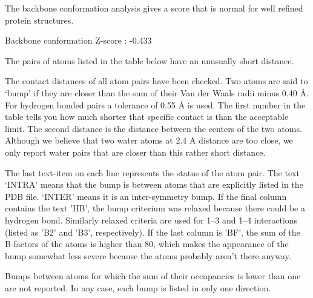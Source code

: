 \begin{note}
The backbone conformation analysis gives a score that is normal
for well refined protein structures.

\parbox{1\textwidth}{
 Backbone conformation Z-score : -0.433
}%

\end{note}

\begin{error}
The pairs of atoms listed in the table below have an unusually
short distance.

The contact distances of all atom pairs have been checked. Two
atoms are said to `bump' if they are closer than the sum of their
Van der Waals radii minus 0.40 {\AA}. For hydrogen bonded pairs
a tolerance of 0.55 {\AA} is used.  The first number in the
table tells you how much shorter that specific contact is than the
acceptable limit. The second distance is the distance between the
centers of the two atoms. Although we believe that two water atoms
at 2.4 A distance are too close, we only report water pairs that are
closer than this rather short distance.

The last text-item on each line represents the status of the atom
pair.  The text `INTRA' means that the bump is between atoms that
are explicitly listed in the PDB file. `INTER' means it is an
inter-symmetry bump. If the final column contains the text 'HB',
the bump criterium was relaxed because there could be a hydrogen
bond. Similarly relaxed criteria are used for 1--3 and 1--4
interactions (listed as 'B2' and 'B3', respectively). If the last
column is 'BF', the sum of the B-factors of the atoms is higher
than 80, which makes the appearance of the bump somewhat less
severe because the atoms probably aren't there anyway.

Bumps between atoms for which the sum of their occupancies is lower
than one are not reported. In any case, each bump is listed in only
one direction.



\end{error}
